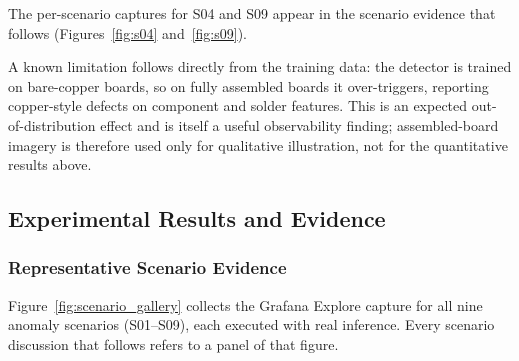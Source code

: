 \documentclass[12pt,a4paper]{article}
\begin{document}
The per-scenario captures for S04 and S09 appear in the scenario evidence that
follows (Figures~\ref{fig:s04} and~\ref{fig:s09}).

A known limitation follows directly from the training data: the detector is
trained on bare-copper boards, so on fully assembled boards it over-triggers,
reporting copper-style defects on component and solder features. This is an
expected out-of-distribution effect and is itself a useful observability finding;
assembled-board imagery is therefore used only for qualitative illustration, not
for the quantitative results above.

\FloatBarrier
\subsection{Experimental Results and Evidence}
\subsubsection{Representative Scenario Evidence}
Figure~\ref{fig:scenario_gallery} collects the Grafana Explore capture for all
nine anomaly scenarios (S01--S09), each executed with real inference. Every
scenario discussion that follows refers to a panel of that figure.
\end{document}
